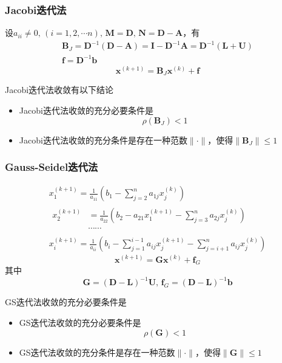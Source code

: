 \subsubsection{Jacobi迭代法}
设$a_{ii}\neq 0,\,(i = 1,2,\cdots n),\,\boldsymbol{M} = \boldsymbol{D},\,\boldsymbol{N} = \boldsymbol{D}-\boldsymbol{A}$，有
\[
    \begin{array}{l}
        \boldsymbol{B}_{J} = \boldsymbol{D}^{-1}(\boldsymbol{D}-\boldsymbol{A}) = \boldsymbol{I}-\boldsymbol{D}^{-1}\boldsymbol{A} = \boldsymbol{D}^{-1}(\boldsymbol{L}+\boldsymbol{U})\\
        \boldsymbol{f} = \boldsymbol{D}^{-1}\boldsymbol{b}
    \end{array}
\]
\[
    \boldsymbol{x}^{(k+1)} = \boldsymbol{B}_{J}\boldsymbol{x}^{(k)}+\boldsymbol{f}
\]
\begin{theorem}[Jacobi迭代的收敛性定理]
    Jacobi迭代法收敛有以下结论
    \begin{itemize}
        \item Jacobi迭代法收敛的充分必要条件是
        \[
            \rho(\boldsymbol{B}_{J})<1        
        \]
        \item Jacobi迭代法收敛的充分条件是存在一种范数$\|\cdot\|$，使得$\|\boldsymbol{B}_{J}\|\leqslant 1$
    \end{itemize}
\end{theorem}
\subsubsection{Gauss-Seidel迭代法}
\[
    \begin{gathered}
        x_{1}^{(k+1)}=\frac{1}{a_{11}}(b_{1}-\sum_{j=2}^{n}a_{1j}x_{j}^{(k)}) \\
        \begin{aligned}x_{2}^{(k+1)}&=\frac{1}{a_{22}}(b_{2}-a_{21}x_{1}^{(k+1)}-\sum_{j=3}^{n}a_{2j}x_{j}^{(k)})\\&\cdots\cdots\end{aligned} \\
        x_{i}^{(k+1)}=\frac{1}{a_{ii}}(b_{i}-\sum_{j=1}^{i-1}a_{ij}x_{j}^{(k+1)}-\sum_{j=i+1}^{n}a_{ij}x_{j}^{(k)}) 
    \end{gathered}
\]
\[
    \boldsymbol{x}^{(k+1)} = \boldsymbol{G}\boldsymbol{x}^{(k)}+\boldsymbol{f}_{G}
\]
其中
\[
    \boldsymbol{G} = (\boldsymbol{D}-\boldsymbol{L})^{-1}\boldsymbol{U},\,\boldsymbol{f}_{G} = (\boldsymbol{D}-\boldsymbol{L})^{-1}\boldsymbol{b}
\]
\begin{theorem}[GS迭代的收敛性定理]
    GS迭代法收敛的充分必要条件是
    \begin{itemize}
        \item GS迭代法收敛的充分必要条件是
        \[
            \rho(\boldsymbol{G})<1        
        \]
        \item GS迭代法收敛的充分条件是存在一种范数$\|\cdot\|$，使得$\|\boldsymbol{G}\|\leqslant 1$
    \end{itemize}
\end{theorem}

